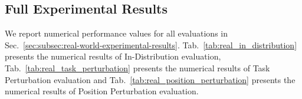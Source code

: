 \subsection{Full Experimental Results}
\label{supp:sec:subsec:real-world-experimental-results-details}


We report numerical performance values for all evaluations in Sec.~\ref{sec:subsec:real-world-experimental-results}. Tab.~\ref{tab:real_in_distribution} presents the numerical results of In-Distribution evaluation, Tab.~\ref{tab:real_task_perturbation} presents the numerical results of Task Perturbation evaluation and Tab.~\ref{tab:real_position_perturbation} presents the numerical results of Position Perturbation evaluation.